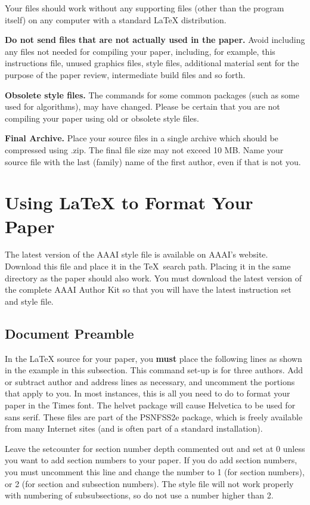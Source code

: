 \documentclass[letterpaper]{article} %
\begin{document}
Your files should work without any supporting files (other than the program itself) on any computer with a standard \LaTeX{} distribution.

\textbf{Do not send files that are not actually used in the paper.} Avoid including any files not needed for compiling your paper, including, for example, this instructions file, unused graphics files, style files, additional material sent for the purpose of the paper review, intermediate build files and so forth.

\textbf{Obsolete style files.} The commands for some common packages (such as some used for algorithms), may have changed. Please be certain that you are not compiling your paper using old or obsolete style files.

\textbf{Final Archive.} Place your source files in a single archive which should be compressed using .zip. The final file size may not exceed 10 MB.
Name your source file with the last (family) name of the first author, even if that is not you.


\section{Using \LaTeX{} to Format Your Paper}

The latest version of the AAAI style file is available on AAAI's website. Download this file and place it in the \TeX\ search path. Placing it in the same directory as the paper should also work. You must download the latest version of the complete AAAI Author Kit so that you will have the latest instruction set and style file.

\subsection{Document Preamble}

In the \LaTeX{} source for your paper, you \textbf{must} place the following lines as shown in the example in this subsection. This command set-up is for three authors. Add or subtract author and address lines as necessary, and uncomment the portions that apply to you. In most instances, this is all you need to do to format your paper in the Times font. The helvet package will cause Helvetica to be used for sans serif. These files are part of the PSNFSS2e package, which is freely available from many Internet sites (and is often part of a standard installation).

Leave the setcounter for section number depth commented out and set at 0 unless you want to add section numbers to your paper. If you do add section numbers, you must uncomment this line and change the number to 1 (for section numbers), or 2 (for section and subsection numbers). The style file will not work properly with numbering of subsubsections, so do not use a number higher than 2.
\end{document}
